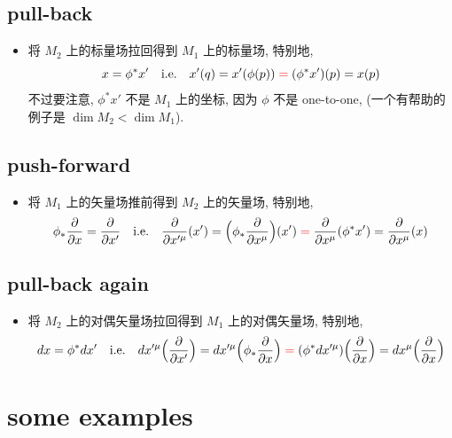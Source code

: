 \documentclass[10pt, a4paper]{article}
\numberwithin{equation}{section}
\begin{document}
	\subsection{pull-back}
	\begin{itemize}
		\item 将 $M_2$ 上的标量场拉回得到 $M_1$ 上的标量场, 特别地,
		\begin{equation}
			x = \phi^* x' \quad \text{i.e.} \quad x'(q) = x'(\phi(p)) \mathcolor{red}{=} (\phi^* x')(p) = x(p)
		\end{equation}
		不过要注意, $\phi^* x'$ 不是 $M_1$ 上的坐标, 因为 $\phi$ 不是 one-to-one, (一个有帮助的例子是 $\dim M_2 < \dim M_1$).
	\end{itemize}
	
	\subsection{push-forward}
	\begin{itemize}
		\item 将 $M_1$ 上的矢量场推前得到 $M_2$ 上的矢量场, 特别地,
		\begin{equation}
			\phi_* \frac{\partial}{\partial x} = \frac{\partial}{\partial x'} \quad \text{i.e.} \quad \frac{\partial}{\partial x'^\mu} (x') = \Big( \phi_* \frac{\partial}{\partial x^\mu} \Big) (x') \mathcolor{red}{=} \frac{\partial}{\partial x^\mu} (\phi^* x') = \frac{\partial}{\partial x^\mu} (x)
		\end{equation}
	\end{itemize}
	
	\subsection{pull-back again}
	\begin{itemize}
		\item 将 $M_2$ 上的对偶矢量场拉回得到 $M_1$ 上的对偶矢量场, 特别地,
		\begin{equation}
			dx = \phi^* dx' \quad \text{i.e.} \quad dx'^\mu \Big( \frac{\partial}{\partial x'} \Big) = dx'^\mu \Big( \phi_* \frac{\partial}{\partial x} \Big) \mathcolor{red}{=} (\phi^* dx'^\mu) \Big( \frac{\partial}{\partial x} \Big) = dx^\mu \Big( \frac{\partial}{\partial x} \Big)
		\end{equation}
	\end{itemize}
	
	\section{some examples}
\end{document}
